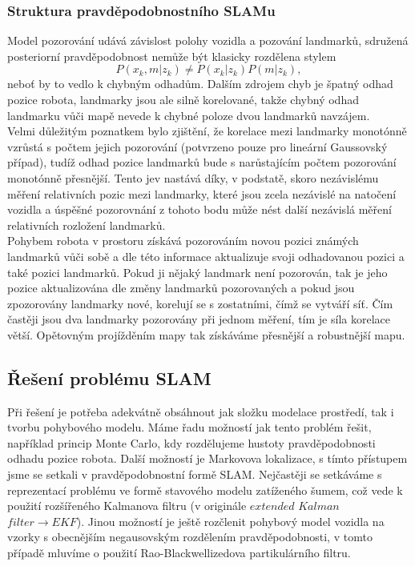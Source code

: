 \documentclass[11pt]{article}
\begin{document}
\subsubsection{Struktura pravděpodobnostního SLAMu}
Model pozorování udává závislost polohy vozidla a pozování landmarků, sdružená posteriorní pravděpodobnost nemůže být klasicky rozdělena stylem 
$$P(x_k,m|z_k)\neq P(x_k|z_k)P(m|z_k),$$
neboť by to vedlo k chybným odhadům. Dalším zdrojem chyb je špatný odhad pozice robota, landmarky jsou ale silně korelované, takže chybný odhad landmarku vůči mapě nevede k chybné poloze dvou landmarků navzájem.\\
\indent Velmi důležitým poznatkem bylo zjištění, že korelace mezi landmarky monotónně vzrůstá s počtem jejich pozorování (potvrzeno pouze pro lineární Gaussovský případ), tudíž odhad pozice landmarků bude s narůstajícím počtem pozorování monotónně přesnější. Tento jev nastává díky, v podstatě, skoro nezávislému měření relativních pozic mezi landmarky, které jsou zcela nezávislé na natočení vozidla a úspěšné pozorovnání z tohoto bodu může nést další nezávislá měření relativních rozložení landmarků. \\
\indent Pohybem robota v prostoru získává pozorováním novou pozici známých landmarků vůči sobě a dle této informace aktualizuje svoji odhadovanou pozici a také pozici landmarků. Pokud ji nějaký landmark není pozorován, tak je jeho pozice aktualizována dle změny landmarků pozorovaných a pokud jsou zpozorovány landmarky nové, korelují se s zostatními, čímž se vytváří síť. Čím častěji jsou dva landmarky pozorovány při jednom měření, tím je síla korelace větší. Opětovným projížděním mapy tak získáváme přesnější a robustnější mapu.\\

\subsection{Řešení problému SLAM}
Při řešení je potřeba adekvátně obsáhnout jak složku modelace prostředí, tak i tvorbu pohybového modelu.
Máme řadu možností jak tento problém řešit, například princip Monte Carlo, kdy rozdělujeme hustoty pravděpodobnosti odhadu pozice robota. Další možností je Markovova lokalizace, s tímto přístupem jsme se setkali v pravděpodobnostní formě SLAM. Nejčastěji se setkáváme s reprezentací problému ve formě stavového modelu zatíženého šumem, což vede k použití rozšířeného Kalmanova filtru (v originále $extended$ $Kalman$ $filter\rightarrow EKF$). Jinou možností je ještě rozčlenit pohybový model vozidla na vzorky s obecnějším negausovským rozdělením pravděpodobnosti, v tomto případě mluvíme o použití Rao-Blackwellizedova partikulárního filtru. 
\end{document}
